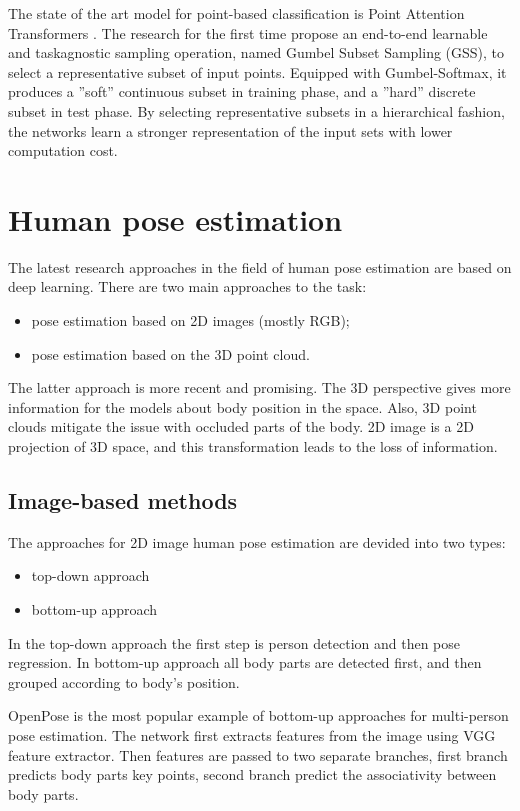 The state of the art model for point-based classification is Point Attention Transformers \cite{yang_modeling_2019}. The research for the first time propose an end-to-end learnable and taskagnostic sampling operation, named Gumbel Subset Sampling (GSS), to select a representative subset of input points. Equipped with Gumbel-Softmax, it produces a ”soft” continuous subset in training phase, and a ”hard” discrete subset in test phase. By selecting representative subsets in a hierarchical fashion, the networks learn a stronger representation of the input sets with lower computation cost.

\section{Human pose estimation}
The latest research approaches in the field of human pose estimation are based on deep learning.
There are two main approaches to the task:
\begin{itemize}
  \item pose estimation based on 2D images (mostly RGB);
  \item pose estimation based on the 3D point cloud.
\end{itemize}

The latter approach is more recent and promising. The 3D perspective gives more information for the models about body position in the space. Also, 3D point clouds mitigate the issue with occluded parts of the body. 2D image is a 2D projection of 3D space, and this transformation leads to the loss of information.

\subsection{Image-based methods}
The approaches for 2D image human pose estimation are devided into two types:
\begin{itemize}
  \item top-down approach
  \item bottom-up approach
\end{itemize}
In the top-down approach the first step is person detection and then pose regression. In bottom-up approach all body parts are detected first, and then grouped according to body's position.

OpenPose \cite{cao_openpose_2019} is the most popular example of bottom-up approaches for multi-person pose estimation. The network first extracts features from the image using VGG feature extractor. Then features are passed to two separate branches, first branch predicts body parts key points, second branch predict the associativity between body parts.

